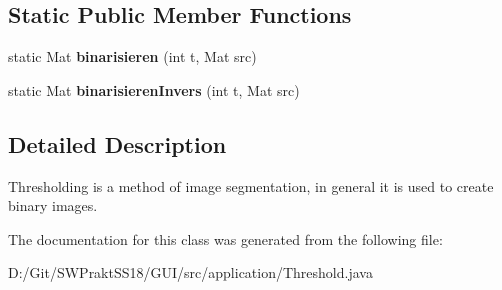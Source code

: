 \subsection*{Static Public Member Functions}
\begin{DoxyCompactItemize}
\item 
\mbox{\label{classapplication_1_1_threshold_a9f6ba95c3de7070efe29d6adb0339a46}} 
static Mat {\bfseries binarisieren} (int t, Mat src)
\item 
\mbox{\label{classapplication_1_1_threshold_a8f32f6f0c1d1861415be5be4a36243d0}} 
static Mat {\bfseries binarisieren\+Invers} (int t, Mat src)
\end{DoxyCompactItemize}


\subsection{Detailed Description}
Thresholding is a method of image segmentation, in general it is used to create binary images. 

The documentation for this class was generated from the following file\+:\begin{DoxyCompactItemize}
\item 
D\+:/\+Git/\+S\+W\+Prakt\+S\+S18/\+G\+U\+I/src/application/Threshold.\+java\end{DoxyCompactItemize}
